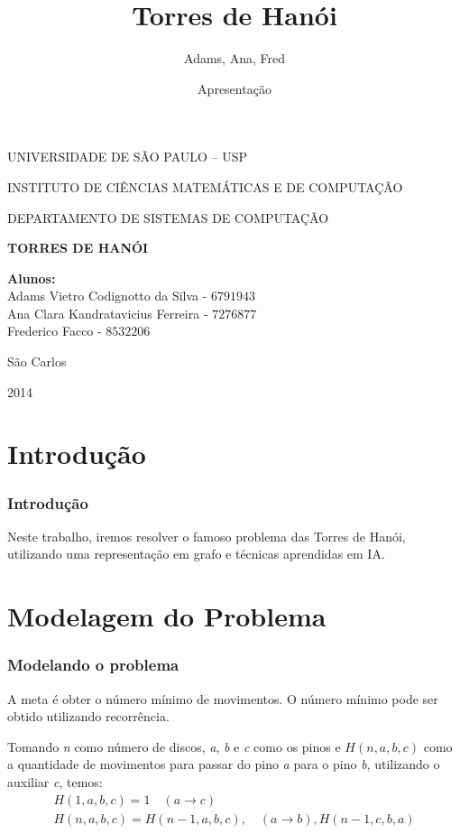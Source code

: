 \documentclass[10pt,portuguese,notheorems,compress]{beamer}
\author{Adams, Ana, Fred}
\title{Torres de Hanói}
\institute{USP-ICMC}
\date[Apresentação]{Apresentação}
\begin{document}
\justifying

\begin{frame}
\begin{center}
	UNIVERSIDADE DE SÃO PAULO – USP
	
	INSTITUTO DE CIÊNCIAS MATEMÁTICAS E DE COMPUTAÇÃO
	
	DEPARTAMENTO DE SISTEMAS DE COMPUTAÇÃO
	
	\vspace{1cm}
	
	\Large{\textbf{TORRES DE HANÓI}}
	
	\vspace{1cm}
	
    \textbf{Alunos:}\\
	Adams Vietro Codignotto da Silva - $6791943$ \\ 
    Ana Clara Kandratavicius Ferreira - $7276877$\\
    Frederico Facco - $8532206$\\
	 
	\vspace{.7cm}
	
	São Carlos
	
	2014
\end{center}
\end{frame}
\section{Introdução}
\begin{frame}
\frametitle{Introdução}
Neste trabalho, iremos resolver o famoso problema das Torres de Hanói, utilizando uma representação em grafo e técnicas aprendidas em IA.
\end{frame}
\section{Modelagem do Problema}
\begin{frame}
\frametitle{Modelando o problema}
A meta é obter o número mínimo de movimentos. O número mínimo pode ser obtido utilizando recorrência.

Tomando \textit{n} como número de discos, \textit{a}, \textit{b} e \textit{c} como os pinos e $H(n,a,b,c)$ como a quantidade de movimentos para passar do pino \textit{a} para o pino \textit{b}, utilizando o auxiliar \textit{c}, temos:
\begin{equation}
\nonumber
\begin{array}{l}
H(1,a,b,c) = 1 \quad (a \rightarrow c)\\
H(n,a,b,c) = H(n-1,a,b,c), \quad (a \rightarrow b), H(n-1,c,b,a)
\end{array}
\end{equation}
\end{frame}
\end{document}
